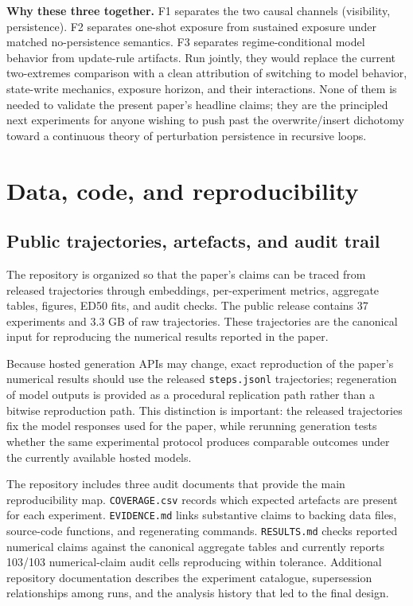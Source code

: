 \documentclass{article}
\theoremstyle{plain}
\theoremstyle{definition}
\begin{document}
\textbf{Why these three together.} F1 separates the two causal channels (visibility, persistence). F2 separates one-shot exposure from sustained exposure under matched no-persistence semantics. F3 separates regime-conditional model behavior from update-rule artifacts. Run jointly, they would replace the current two-extremes comparison with a clean attribution of switching to model behavior, state-write mechanics, exposure horizon, and their interactions. None of them is needed to validate the present paper's headline claims; they are the principled next experiments for anyone wishing to push past the overwrite/insert dichotomy toward a continuous theory of perturbation persistence in recursive loops.

\section{Data, code, and reproducibility}

\subsection{Public trajectories, artefacts, and audit trail}

The repository is organized so that the paper's claims can be traced from released trajectories through embeddings, per-experiment metrics, aggregate tables, figures, ED50 fits, and audit checks. The public release contains 37 experiments and 3.3 GB of raw trajectories. These trajectories are the canonical input for reproducing the numerical results reported in the paper.

Because hosted generation APIs may change, exact reproduction of the paper's numerical results should use the released \texttt{steps.jsonl} trajectories; regeneration of model outputs is provided as a procedural replication path rather than a bitwise reproduction path. This distinction is important: the released trajectories fix the model responses used for the paper, while rerunning generation tests whether the same experimental protocol produces comparable outcomes under the currently available hosted models.

The repository includes three audit documents that provide the main reproducibility map. \texttt{COVERAGE.csv} records which expected artefacts are present for each experiment. \texttt{EVIDENCE.md} links substantive claims to backing data files, source-code functions, and regenerating commands. \texttt{RESULTS.md} checks reported numerical claims against the canonical aggregate tables and currently reports 103/103 numerical-claim audit cells reproducing within tolerance. Additional repository documentation describes the experiment catalogue, supersession relationships among runs, and the analysis history that led to the final design.
\end{document}

